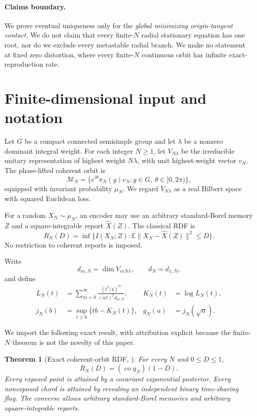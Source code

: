 \documentclass[11pt]{article}
\newtheorem{theorem}{Theorem}[section]
\newcommand{\E}{\mathbb E}
\newcommand{\co}{\operatorname{co}}
\begin{document}
\paragraph{Claims boundary.}
We prove eventual uniqueness only for the \emph{global minimizing
origin-tangent contact}.  We do not claim that every finite-$N$ radial
stationary equation has one root, nor do we exclude every metastable radial
branch.  We make no statement at fixed zero distortion, where every
finite-$N$ continuous orbit has infinite exact-reproduction rate.

\section{Finite-dimensional input and notation}

Let $G$ be a compact connected semisimple group and let $\lambda$ be a
nonzero dominant integral weight.  For each integer $N\ge1$, let
$V_{N\lambda}$ be the irreducible unitary representation of highest weight
$N\lambda$, with unit highest-weight vector $v_N$.  The phase-lifted coherent
orbit is
\[
 \mathcal M_N=\{e^{i\theta}\pi_N(g)v_N:
 g\in G,\ \theta\in[0,2\pi)\},
\]
equipped with invariant probability $\mu_N$.  We regard $V_{N\lambda}$ as a
real Hilbert space with squared Euclidean loss.

For a random $X_N\sim\mu_N$, an encoder may use an arbitrary
standard-Borel memory $Z$ and a square-integrable report $\widehat X(Z)$.
The classical RDF is
\[
 R_N(D)=\inf\{I(X_N;Z):
 \E\|X_N-\widehat X(Z)\|^2\le D\}.
\]
No restriction to coherent reports is imposed.

Write
\[
 d_{m,N}=\dim V_{mN\lambda},\qquad d_N=d_{1,N},
\]
and define
\begin{align}
 L_N(t)&=\sum_{m=0}^{\infty}
 \frac{(t^2/4)^m}{(m!)^2d_{m,N}}, & K_N(t)&=\log L_N(t), \label{eq:LN}\\
 j_N(b)&=\sup_{t\ge0}\{tb-K_N(t)\}, &
 g_N(u)&=j_N(\sqrt u).                                      \label{eq:jn}
\end{align}

We import the following exact result, with attribution explicit because the
finite-$N$ theorem is not the novelty of this paper.

\begin{theorem}[Exact coherent-orbit RDF, \cite{Eriksson2026Coherent}]
\label{thm:finite}
For every $N$ and $0\le D\le1$,
\[
 \boxed{R_N(D)=(\co g_N)(1-D).}                           \tag{2.3}
\]
Every exposed point is attained by a covariant exponential posterior.
Every nonexposed chord is attained by revealing an independent binary
time-sharing flag.  The converse allows arbitrary standard-Borel memories
and arbitrary square-integrable reports.
\end{theorem}
\end{document}
